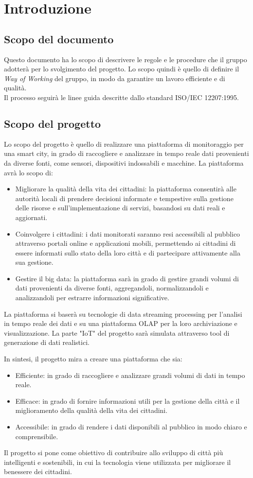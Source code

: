 \section{Introduzione}
\subsection{Scopo del documento}
Questo documento ha lo scopo di descrivere le regole e le procedure che il gruppo adotterà per lo svolgimento del progetto. Lo scopo quindi è quello di definire il \textit{Way of Working} del gruppo, in modo da garantire un lavoro efficiente e di qualità.\\
Il processo seguirà le linee guida descritte dallo standard ISO/IEC 12207:1995.

\subsection{Scopo del progetto}
Lo scopo del progetto è quello di realizzare una piattaforma di monitoraggio per una smart city, in grado di raccogliere e analizzare in tempo reale dati provenienti da diverse fonti, come sensori, dispositivi indossabili e macchine. La piattaforma avrà lo scopo di:
\begin{itemize}
	\itemsep0em
    \item Migliorare la qualità della vita dei cittadini: la piattaforma consentirà alle autorità locali di prendere decisioni informate e tempestive sulla gestione delle risorse e sull'implementazione di servizi, basandosi su dati reali e aggiornati.
    \item Coinvolgere i cittadini: i dati monitorati saranno resi accessibili al pubblico attraverso portali online e applicazioni mobili, permettendo ai cittadini di essere informati sullo stato della loro città e di partecipare attivamente alla sua gestione.
    \item Gestire il big data: la piattaforma sarà in grado di gestire grandi volumi di dati provenienti da diverse fonti, aggregandoli, normalizzandoli e analizzandoli per estrarre informazioni significative.
\end{itemize}
La piattaforma si baserà su tecnologie di data streaming processing per l'analisi in tempo reale dei dati e su una piattaforma OLAP per la loro archiviazione e visualizzazione. La parte "IoT" del progetto sarà simulata attraverso tool di generazione di dati realistici.

In sintesi, il progetto mira a creare una piattaforma che sia:
\begin{itemize}
    \item Efficiente: in grado di raccogliere e analizzare grandi volumi di dati in tempo reale.
    \item Efficace: in grado di fornire informazioni utili per la gestione della città e il miglioramento della qualità della vita dei cittadini.
    \item Accessibile: in grado di rendere i dati disponibili al pubblico in modo chiaro e comprensibile.
\end{itemize}
Il progetto si pone come obiettivo di contribuire allo sviluppo di città più intelligenti e sostenibili, in cui la tecnologia viene utilizzata per migliorare il benessere dei cittadini.

